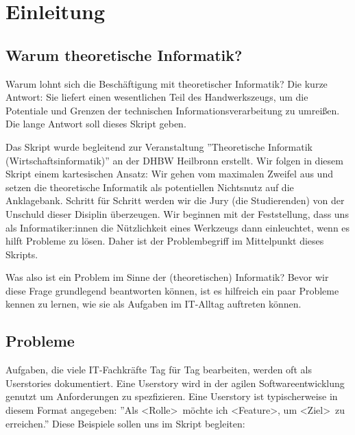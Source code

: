 \chapter{Einleitung}
\section{Warum theoretische Informatik?}
Warum lohnt sich die Beschäftigung mit theoretischer Informatik?
Die kurze Antwort: Sie liefert einen wesentlichen Teil des Handwerkszeugs,
um die Potentiale und Grenzen der technischen Informationsverarbeitung zu umreißen.
Die lange Antwort soll dieses Skript geben.

Das Skript wurde begleitend zur Veranstaltung
''Theoretische Informatik (Wirtschaftsinformatik)''
an der DHBW Heilbronn erstellt.
Wir folgen in diesem Skript einem kartesischen Ansatz:
Wir gehen vom maximalen Zweifel aus und setzen die theoretische Informatik
als potentiellen Nichtsnutz auf die Anklagebank.
Schritt für Schritt werden wir die Jury (die Studierenden) von der Unschuld dieser
Disiplin überzeugen.
Wir beginnen mit der Feststellung, dass uns als Informatiker:innen die Nützlichkeit
eines Werkzeugs dann einleuchtet, wenn es hilft Probleme zu lösen.
Daher ist der Problembegriff im Mittelpunkt dieses Skripts.

Was also ist ein Problem im Sinne der (theoretischen) Informatik?
Bevor wir diese Frage grundlegend beantworten können,
ist es hilfreich ein paar Probleme kennen zu lernen,
wie sie als Aufgaben im IT-Alltag auftreten können.

\section{Probleme}
Aufgaben, die viele IT-Fachkräfte Tag für Tag bearbeiten,
werden oft als Userstories dokumentiert.
Eine Userstory wird in der agilen Softwareentwicklung genutzt um Anforderungen zu spezfizieren.
Eine Userstory ist typischerweise in diesem Format angegeben:
''Als \textless Rolle\textgreater\ möchte ich \textless Feature\textgreater,
um \textless Ziel\textgreater\ zu erreichen.''
Diese Beispiele sollen uns im Skript begleiten:

